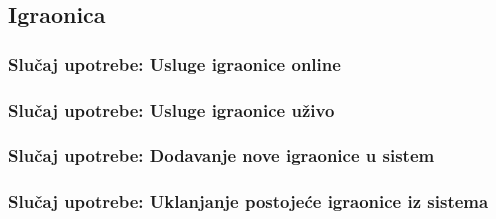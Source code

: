 \documentclass[a4paper]{article}
\begin{document}
\subsection{Igraonica}

\subsubsection{Slučaj upotrebe: Usluge igraonice online}


\subsubsection{Slučaj upotrebe: Usluge igraonice uživo}


\subsubsection{Slučaj upotrebe: Dodavanje nove igraonice u sistem}


\subsubsection{Slučaj upotrebe: Uklanjanje postojeće igraonice iz sistema}

\end{document}
